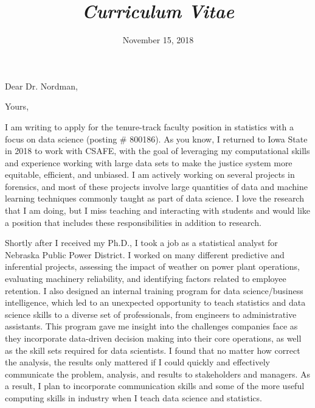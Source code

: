 \documentclass[12pt, letterpaper, sans]{moderncv}
\title{\emph{Curriculum Vitae}}
\begin{document}
\date{November 15, 2018}
\opening{Dear Dr. Nordman,}
\closing{Yours,}
\makelettertitle

I am writing to apply for the tenure-track faculty position in statistics with a focus on data science (posting \# 800186). As you know, I returned to Iowa State in 2018 to work with CSAFE, with the goal of leveraging my computational skills and experience working with large data sets to make the justice system more equitable, efficient, and unbiased. I am actively working on several projects in forensics, and most of these projects involve large quantities of data and machine learning techniques commonly taught as part of data science. I love the research that I am doing, but I miss teaching and interacting with students and would like a position that includes these responsibilities in addition to research. 

Shortly after I received my Ph.D., I took a job as a statistical analyst for Nebraska Public Power District. I worked on many different predictive and inferential projects, assessing the impact of weather on power plant operations, evaluating machinery reliability, and identifying factors related to employee retention. I also designed an internal training program for data science/business intelligence, which led to an unexpected opportunity to teach statistics and data science skills to a diverse set of professionals, from engineers to administrative assistants. This program gave me insight into the challenges companies face as they incorporate data-driven decision making into their core operations, as well as the skill sets required for data scientists. I found that no matter how correct the analysis, the results only mattered if I could quickly and effectively communicate the problem, analysis, and results to stakeholders and managers. As a result, I plan to incorporate communication skills and some of the more useful computing skills in industry when I teach data science and statistics. 
\end{document}
